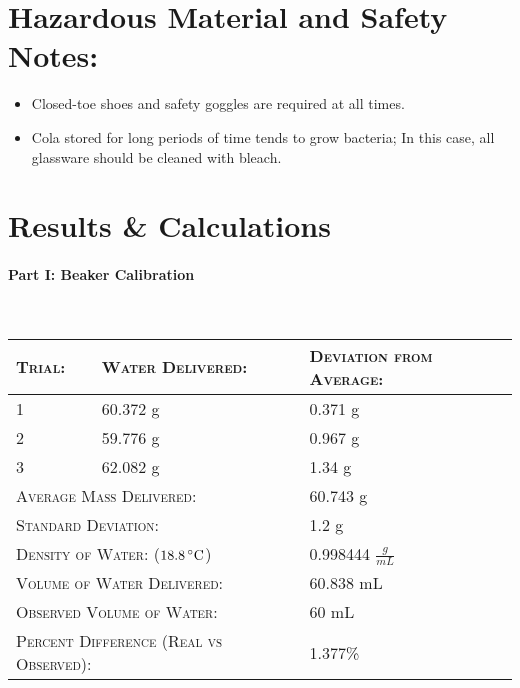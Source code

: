 \documentclass[11pt,letterpaper]{report}
\begin{document}
\section*{Hazardous Material and Safety Notes:}
\begin{itemize}
\item Closed-toe shoes and safety goggles are required at all times. \\[-0.5cm]
\item Cola stored for long periods of time tends to grow bacteria; In this case, all glassware should be cleaned with bleach. \\[-0.5cm]
\end{itemize}


\section*{Results \& Calculations}

\paragraph{Part I: Beaker Calibration}\mbox{}\\
\begin{tabularx}{\textwidth}{ | X| X| X|}
\hline
\textsc{Trial:} & \textsc{Water Delivered:} & \textsc{Deviation from Average:} \\
\hline
1 & 60.372 g & 0.371 g\\
2 & 59.776 g & 0.967 g\\
3 & 62.082 g & 1.34 g\\
\hline
\multicolumn{2}{|l|}{\textsc{Average Mass Delivered:}} & 60.743 g \\
\hline
\multicolumn{2}{|l|}{\textsc{Standard Deviation:}} & 1.2 g \\
\hline
\multicolumn{2}{|l|}{\textsc{Density of Water: ($18.8\,^{\circ}{\rm C}$)}} & 0.998444 $\frac{g}{mL}$ \\
\hline
\multicolumn{2}{|l|}{\textsc{Volume of Water Delivered:}} & 60.838 mL \\
\hline
\multicolumn{2}{|l|}{\textsc{Observed Volume of Water:}} & 60 mL \\
\hline
\multicolumn{2}{|l|}{\textsc{Percent Difference (Real vs Observed):}} & 1.377\% \\
\hline
\end{tabularx}
\end{document}

